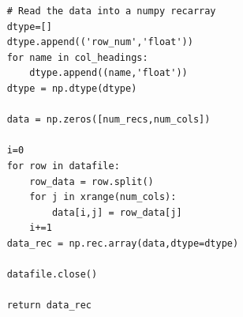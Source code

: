 \documentclass[a4paper,11pt,oneside]{article}
\begin{document}
\begin{lstlisting}
    # Read the data into a numpy recarray
    dtype=[]
    dtype.append(('row_num','float'))
    for name in col_headings:
        dtype.append((name,'float'))
    dtype = np.dtype(dtype)
    
    data = np.zeros([num_recs,num_cols])
    
    i=0
    for row in datafile:
        row_data = row.split()
        for j in xrange(num_cols):
            data[i,j] = row_data[j]
        i+=1
    data_rec = np.rec.array(data,dtype=dtype)
    
    datafile.close()
    
    return data_rec

\end{lstlisting}
\end{document}
